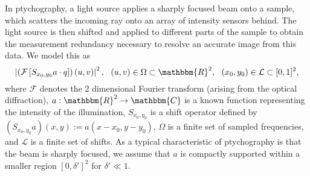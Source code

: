 \documentclass[]{spie}  %
\def \supp {{\rm supp}}
\begin{document}
In ptychography, a light source applies a sharply focused beam onto a sample, which scatters the incoming ray onto an array of intensity sensors behind.  The light source is then shifted and applied to different parts of the sample to obtain the measurement redundancy necessary to resolve an accurate image from this data.  We model this as
\begin{equation}
\left| \left(\mathcal{F}\left[S_{x_0, y_0}a \cdot q\right] \right)(u,v) \right|^2, ~~(u,v) \in \Omega \subset \mathbbm{R}^2,~~(x_0, y_0) \in \mathcal{L} \subset [0,1]^2,
\label{def:Prob_Continuous}
\end{equation}
where $\mathcal{F}$ denotes the 2 dimensional Fourier transform (arising from the optical diffraction), $a:\mathbbm{R}^2 \rightarrow \mathbbm{C}$ is a known function representing the intensity of the illumination, $S_{x_0, y_0}$ is a shift operator defined by $\left(S_{x_0, y_0}a\right)(x,y) := a(x-x_0, y-y_0)$, $\Omega$ is a finite set of sampled frequencies, and $\mathcal{L}$ is a finite set of shifts.  %
As a typical characteristic of ptychography is that the beam is sharply focused, we assume that $a$ is compactly supported within a smaller region $[0, \delta']^2$ for $\delta' \ll 1$.  %
\end{document}
